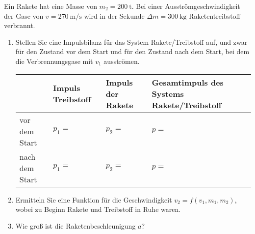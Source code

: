 \documentclass[a4paper]{scrartcl}
\begin{document}
\begin{aufgabe}[points={6}]
Ein Rakete hat eine Masse von $m_2=\SI{200}{\tonne}$. Bei einer Ausströmgeschwindigkeit der Gase von $v=\SI{270}{\meter\per\second}$ wird in der Sekunde $\Delta m=\SI{300}{\kilogram}$ Raketentreibstoff verbrannt.
	\begin{enumerate}[label=(\alph*)]
	\item Stellen Sie eine Impulsbilanz für das System Rakete/Treibstoff auf, und zwar für den Zustand vor dem Start und für den Zustand nach dem Start, bei dem die Verbrennungsgase mit $v_1$ ausströmen.\\
	\begin{tabular}{|l|p{2.7cm}|p{2.7cm}|p{4.5cm}|}
    	    \hline 
    	    \rule[-1ex]{0pt}{2.5ex}   & Impuls Treibstoff & Impuls der Rakete & Gesamtimpuls des Systems Rakete/Treibstoff \\ 
    	    \hline 
    	    \rule[-1ex]{0pt}{2.5ex} vor dem Start & $p_1=$ & $p_2=$ & $p=$ \\ 
    	    \hline 
    	    \rule[-1ex]{0pt}{2.5ex} nach dem Start & $p_1=$ & $p_2=$ & $p=$ \\ 
    	    \hline 
    	    \end{tabular}
	\item Ermitteln Sie eine Funktion für die Geschwindigkeit $v_2=f(v_1,m_1,m_2)$, wobei zu Beginn Rakete und Treibstoff in Ruhe waren.
	\item Wie groß ist die Raketenbeschleunigung $a$?
	\end{enumerate}
	

\end{aufgabe}
\end{document}
